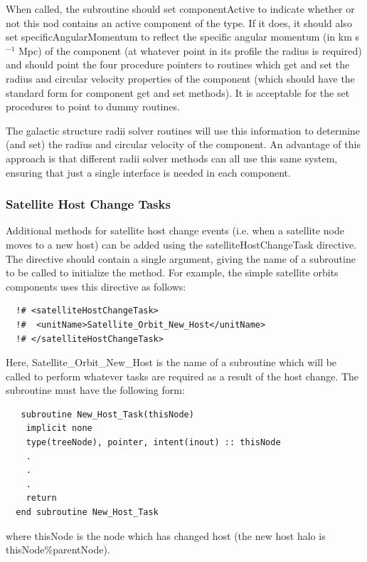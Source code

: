 When called, the subroutine should set {\normalfont \ttfamily componentActive} to indicate whether or not this nod contains an active component of the type. If it does, it should also set {\normalfont \ttfamily specificAngularMomentum} to reflect the specific angular momentum (in km s$^{-1}$ Mpc) of the component (at whatever point in its profile the radius is required) and should point the four procedure pointers to routines which get and set the radius and circular velocity properties of the component (which should have the standard form for component get and set methods). It is acceptable for the set procedures to point to dummy routines.

The galactic structure radii solver routines will use this information to determine (and set) the radius and circular velocity of the component. An advantage of this approach is that different radii solver methods can all use this same system, ensuring that just a single interface is needed in each component.

\subsubsection{Satellite Host Change Tasks}

Additional methods for satellite host change events (i.e. when a satellite node moves to a new host) can be added using the {\normalfont \ttfamily satelliteHostChangeTask} directive. The directive should contain a single argument, giving the name of a subroutine to be called to initialize the method. For example, the {\normalfont \ttfamily simple} satellite orbits components uses this directive as follows:
\begin{verbatim}
  !# <satelliteHostChangeTask>
  !#  <unitName>Satellite_Orbit_New_Host</unitName>
  !# </satelliteHostChangeTask>
\end{verbatim}
Here, {\normalfont \ttfamily Satellite\_Orbit\_New\_Host} is the name of a subroutine which will be called to perform whatever tasks are required as a result of the host change. The subroutine must have the following form:
\begin{verbatim}
   subroutine New_Host_Task(thisNode)
    implicit none
    type(treeNode), pointer, intent(inout) :: thisNode
    .
    .
    .
    return
  end subroutine New_Host_Task
\end{verbatim}
where {\normalfont \ttfamily thisNode} is the node which has changed host (the new host halo is {\normalfont \ttfamily thisNode\%parentNode}).

